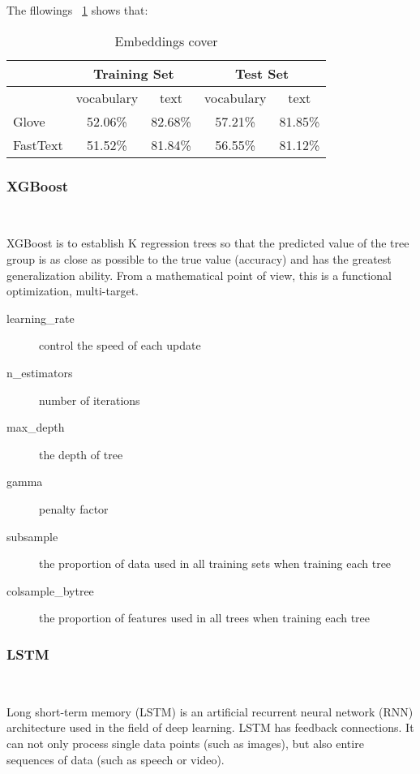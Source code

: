 The fllowings ~\cref{tab:Embeddings-cover} shows that:
\begin{table}[htbp]
	\centering
	\caption{Embeddings cover}
	\begin{tabular}{lcccc}
		\toprule
		& \multicolumn{2}{c}{Training Set} & \multicolumn{2}{c}{Test Set} \\
		\midrule
		& vocabulary & text  & vocabulary & text \\
		\midrule
		Glove & 52.06\% & 82.68\% & 57.21\% & 81.85\% \\
		FastText & 51.52\% & 81.84\% & 56.55\% & 81.12\% \\
		\bottomrule
	\end{tabular}%
	\label{tab:Embeddings-cover}%
\end{table}%
                  
	
\subsubsection{XGBoost}
\
 
XGBoost is to establish K regression trees 
so that the predicted value of 
the tree group is as close as possible to 
the true value (accuracy) and 
has the greatest generalization ability. 
From a mathematical point of view, 
this is a functional optimization, multi-target.

\begin{description}
	\item[learning\_rate]  control the speed of each update
	\item[n\_estimators] number of iterations
	\item[max\_depth] the depth of tree
	\item[gamma] penalty factor%
	\item[subsample] the proportion of data used in 
		all training sets when training each tree
	\item[colsample\_bytree] the proportion of features used 
		in all trees when training each tree
	\end{description}

\subsubsection{LSTM}
\

Long short-term memory (LSTM) is an artificial 
recurrent neural network (RNN) 
architecture used in the field of 
deep learning. LSTM has feedback connections. 
It can not only process single data 
points (such as images), but also entire 
sequences of data (such as speech or video). 
	
